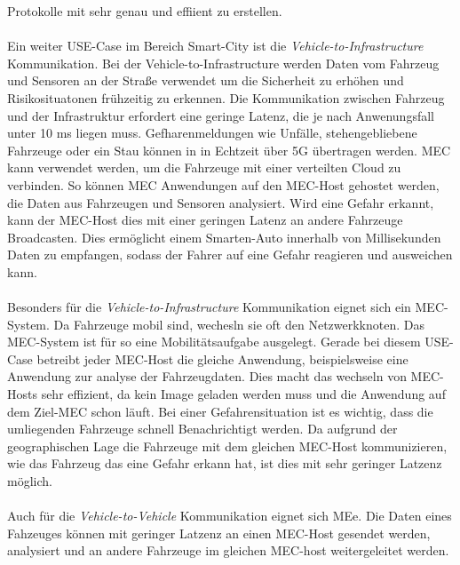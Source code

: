 \documentclass[runningheads]{llncs}
\numberwithin{figure}{section}
\begin{document}
Protokolle mit sehr genau und effiient zu erstellen. 
\\
\\
Ein weiter USE-Case im Bereich Smart-City ist die \textit{Vehicle-to-Infrastructure} Kommunikation.
Bei der Vehicle-to-Infrastructure werden Daten vom Fahrzeug und Sensoren an der Straße verwendet um die Sicherheit zu erhöhen und 
Risikosituatonen frühzeitig zu erkennen. 
Die Kommunikation zwischen Fahrzeug und der Infrastruktur erfordert eine geringe Latenz, 
die je nach Anwenungsfall unter 10 ms liegen muss. 
Gefharenmeldungen wie Unfälle, stehengebliebene Fahrzeuge oder ein Stau können in in Echtzeit über 5G übertragen werden.
MEC kann verwendet werden, um die Fahrzeuge mit einer verteilten Cloud zu verbinden. So können MEC Anwendungen auf den MEC-Host 
gehostet werden, die Daten aus Fahrzeugen und Sensoren analysiert. Wird eine Gefahr erkannt, kann der MEC-Host dies mit einer
geringen Latenz an andere Fahrzeuge Broadcasten. 
Dies ermöglicht einem Smarten-Auto innerhalb von Millisekunden Daten zu empfangen, 
sodass der Fahrer auf eine Gefahr reagieren und ausweichen kann.
\\
\\
Besonders für die \textit{Vehicle-to-Infrastructure} Kommunikation eignet sich ein MEC-System. Da Fahrzeuge mobil sind, wechesln sie
oft den Netzwerkknoten. Das MEC-System ist für so eine Mobilitätsaufgabe ausgelegt. Gerade bei diesem USE-Case betreibt 
jeder MEC-Host die gleiche Anwendung, beispielsweise eine Anwendung zur analyse der Fahrzeugdaten. Dies macht das wechseln von MEC-Hosts sehr effizient,
da kein Image geladen werden muss und die Anwendung auf dem Ziel-MEC schon läuft. Bei einer Gefahrensituation ist es wichtig, dass die
umliegenden Fahrzeuge schnell Benachrichtigt werden. Da aufgrund der geographischen Lage die Fahrzeuge mit dem gleichen MEC-Host
kommunizieren, wie das Fahrzeug das eine Gefahr erkann hat, ist dies mit sehr geringer Latzenz möglich. 
\\
\\
Auch für die \textit{Vehicle-to-Vehicle} Kommunikation eignet sich MEe. Die Daten eines Fahzeuges können mit geringer Latzenz
an einen MEC-Host gesendet werden, analysiert und an andere Fahrzeuge im gleichen MEC-host weitergeleitet werden.
\end{document}
